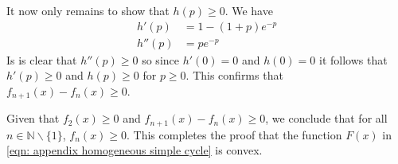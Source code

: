 \documentclass[11pt,a4paper]{article}
\begin{document}
It now only remains to show that $h(p) \geq 0$.
We have
\begin{align}
    h'(p) &= 1 - (1+p)e^{-p} \\
    h''(p) &= p e^{-p}
\end{align}
Is is clear that $h''(p) \geq 0$ so since $h'(0) = 0$ and $h(0) = 0$ it follows that $h'(p) \geq 0$ and $h(p) \geq 0$ for $p\geq 0$. This confirms that $f_{n+1}(x) - f_{n}(x) \geq 0$.

Given that $f_2(x) \geq 0$ and $f_{n+1}(x) - f_{n}(x) \geq 0$, we conclude that for all $n \in \mathbb{N} \backslash \{ 1\}$, $f_n(x) \geq 0$. This completes the proof that the function $F(x)$ in \eqref{eqn: appendix homogeneous simple cycle} is convex.
\end{document}
